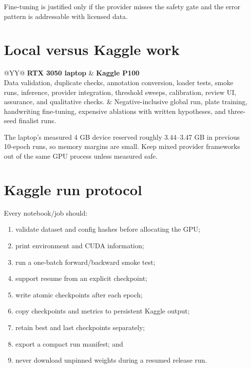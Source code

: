 Fine-tuning is justified only if the provider misses the safety gate and the error pattern is addressable with licensed data.

\section{Local versus Kaggle work}

\begin{tabularx}{\textwidth}{@{}YY@{}}
\toprule
\textbf{RTX 3050 laptop} & \textbf{Kaggle P100} \\
\midrule
Data validation, duplicate checks, annotation conversion, loader tests, smoke runs, inference, provider integration, threshold sweeps, calibration, review UI, assurance, and qualitative checks. & Negative-inclusive global run, plate training, handwriting fine-tuning, expensive ablations with written hypotheses, and three-seed finalist runs. \\
\bottomrule
\end{tabularx}

The laptop's measured 4 GB device reserved roughly 3.44--3.47 GB in previous 10-epoch runs, so memory margins are small. Keep mixed provider frameworks out of the same GPU process unless measured safe.

\section{Kaggle run protocol}

Every notebook/job should:

\begin{enumerate}[leftmargin=7mm]
  \item validate dataset and config hashes before allocating the GPU;
  \item print environment and CUDA information;
  \item run a one-batch forward/backward smoke test;
  \item support resume from an explicit checkpoint;
  \item write atomic checkpoints after each epoch;
  \item copy checkpoints and metrics to persistent Kaggle output;
  \item retain best and last checkpoints separately;
  \item export a compact run manifest; and
  \item never download unpinned weights during a resumed release run.
\end{enumerate}

